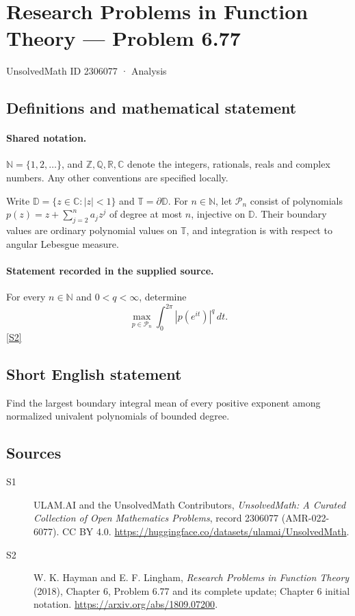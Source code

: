 \documentclass[11pt]{article}
\newcommand{\sref}[2]{\hyperlink{source:#1:#2}{[S#2]}}
\begin{document}
\setcounter{section}{2306076}
\section{Research Problems in Function Theory — Problem 6.77}\label{2306077}
{\small\sffamily UnsolvedMath ID 2306077 · Analysis}
\subsection{Definitions and mathematical statement}

\paragraph{Shared notation.}$\mathbb N=\{1,2,\ldots\}$, and $\mathbb Z,\mathbb Q,\mathbb R,\mathbb C$ denote the integers, rationals, reals and complex numbers. Any other conventions are specified locally.


Write $\mathbb D=\{z\in\mathbb C:|z|<1\}$ and $\mathbb T=\partial\mathbb D$. For $n\in\mathbb N$, let $\mathcal P_n$ consist of polynomials $p(z)=z+\sum_{j=2}^n a_jz^j$ of degree at most $n$, injective on $\mathbb D$. Their boundary values are ordinary polynomial values on $\mathbb T$, and integration is with respect to angular Lebesgue measure.
\paragraph{Statement recorded in the supplied source.}
For every $n\in\mathbb N$ and $0<q<\infty$, determine \[\max_{p\in\mathcal P_n}\int_0^{2\pi}|p(e^{it})|^q\,dt.\] \sref{2306077}{2}
\subsection{Short English statement}
Find the largest boundary integral mean of every positive exponent among normalized univalent polynomials of bounded degree.
\subsection{Sources}
\begin{description}
\item[\hypertarget{source:2306077:1}{S1}] ULAM.AI and the UnsolvedMath Contributors, \emph{UnsolvedMath: A Curated Collection of Open Mathematics Problems}, record 2306077 (AMR-022-6077). CC BY 4.0. \url{https://huggingface.co/datasets/ulamai/UnsolvedMath}.
\item[\hypertarget{source:2306077:2}{S2}] W. K. Hayman and E. F. Lingham, \emph{Research Problems in Function Theory} (2018), Chapter 6, Problem 6.77 and its complete update; Chapter 6 initial notation. \url{https://arxiv.org/abs/1809.07200}.
\end{description}
\label{end:2306077}
\end{document}
